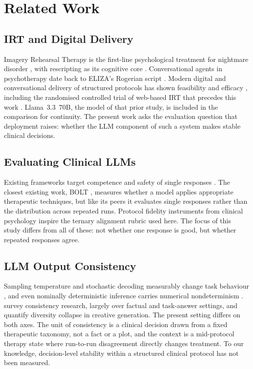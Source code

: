 \section{Related Work}
\label{sec:related}

\subsection{IRT and Digital Delivery}

Imagery Rehearsal Therapy is the first-line psychological treatment for nightmare disorder \citep{krakow1995imagery, krakow2001imagery, morgenthaler2018position}, with rescripting as its cognitive core \citep{albanese2022nightmare}. Conversational agents in psychotherapy date back to ELIZA's Rogerian script \citep{weizenbaum1966eliza}. Modern digital and conversational delivery of structured protocols has shown feasibility and efficacy \citep{fitzpatrick2017delivering, heinz2025randomized, wu2026pilot}, including the randomised controlled trial of web-based IRT that precedes this work \citep{voss2026efficacy}. Llama~3.3~70B, the model of that prior study, is included in the comparison for continuity. The present work asks the evaluation question that deployment raises: whether the LLM component of such a system makes stable clinical decisions.

\subsection{Evaluating Clinical LLMs}

Existing frameworks target competence and safety of single responses \citep{zhang2024psyeval, iftikhar2025llm, stade2024large}. The closest existing work, BOLT \citep{chiu2024computational}, measures whether a model applies appropriate therapeutic techniques, but like its peers it evaluates single responses rather than the distribution across repeated runs. Protocol fidelity instruments from clinical psychology \citep{mowbray2003fidelity, bellg2004enhancing, kohrt2015therapist} inspire the ternary alignment rubric used here. The focus of this study differs from all of these: not whether one response is good, but whether repeated responses agree.

\subsection{LLM Output Consistency}

Sampling temperature and stochastic decoding measurably change task behaviour \citep{renze2024effect}, and even nominally deterministic inference carries numerical nondeterminism \citep{yuan2025understanding}. \citet{novikova2025consistency} survey consistency research, largely over factual and task-answer settings, and \citet{xu2025echoes} quantify diversity collapse in creative generation. The present setting differs on both axes. The unit of consistency is a clinical decision drawn from a fixed therapeutic taxonomy, not a fact or a plot, and the context is a mid-protocol therapy state where run-to-run disagreement directly changes treatment. To our knowledge, decision-level stability within a structured clinical protocol has not been measured.

